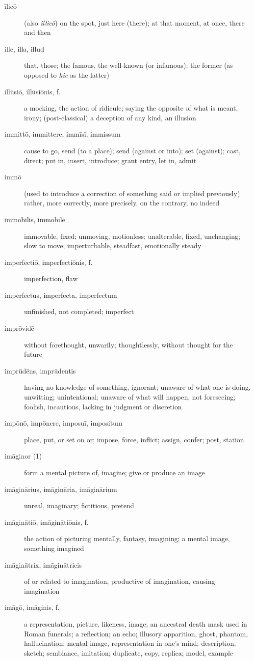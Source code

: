 \begin{description}
    \item[īlicō] (also \textit{illicō}) on the spot, just here (there); at that moment, at once, there and then
    \item[ille, illa, illud] \marginnote{*}that, those; the famous, the well-known (or infamous); the former (as opposed to \textit{hic} as the latter)
    \item[illūsiō, illūsiōnis, f.] a mocking, the action of ridicule; saying the opposite of what is meant, irony; (post-classical) a deception of any kind, an illusion
    \item[immittō, immittere, immīsī, immissum] cause to go, send (to a place); send (against or into); set (against); cast, direct; put in, insert, introduce; grant entry, let in, admit
    \item[immō] \marginnote{*}(used to introduce a correction of something said or implied previously) rather, more correctly, more precisely, on the contrary, no indeed
    \item[immōbilis, immōbile] immovable, fixed; unmoving, motionless; unalterable, fixed, unchanging; slow to move; imperturbable, steadfast, emotionally steady
    \item[imperfectiō, imperfectiōnis, f.] imperfection, flaw
    \item[imperfectus, imperfecta, imperfectum] unfinished, not completed; imperfect
    \item[imprōvidē] without forethought, unwarily; thoughtlessly, without thought for the future
    \item[imprūdēns, imprūdentis] having no knowledge of something, ignorant; unaware of what one is doing, unwitting; unintentional; unaware of what will happen, not foreseeing; foolish, incautious, lacking in judgment or discretion
    \item[impōnō, impōnere, imposuī, impositum] \marginnote{*}place, put, or set on or; impose, force, inflict; assign, confer; post, station
    \item[imāginor (1)] form a mental picture of, imagine; give or produce an image
    \item[imāginārius, imāgināria, imāginārium] unreal, imaginary; fictitious, pretend
    \item[imāginātiō, imāginātiōnis, f.] the action of picturing mentally, fantasy, imagining; a mental image, something imagined
    \item[imāginātrix, imāginātricis] of or related to imagination, productive of imagination, causing imagination
    \item[imāgō, imāginis, f.] a representation, picture, likeness, image; an ancestral death mask used in Roman funerals; a reflection; an echo; illusory apparition, ghost, phantom, hallucination; mental image, representation in one's mind; description, sketch; semblance, imitation; duplicate, copy, replica; model, example

\end{description}
